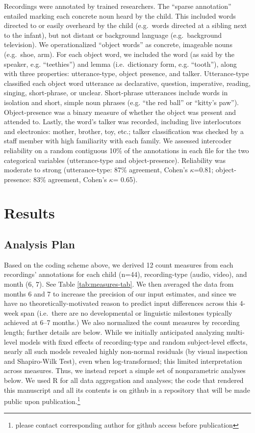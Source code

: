 \documentclass[man]{apa6}
\theoremstyle{definition}
\theoremstyle{definition}
\theoremstyle{definition}
\theoremstyle{remark}
\begin{document}
Recordings were annotated by trained researchers. The \enquote{sparse
annotation} entailed marking each concrete noun heard by the child. This
included words directed to or easily overheard by the child (e.g.~words
directed at a sibling next to the infant), but not distant or background
language (e.g.~background television). We operationalized
\enquote{object words} as concrete, imageable nouns (e.g.~shoe, arm).
For each object word, we included the word (as said by the speaker, e.g.
\enquote{teethies}) and lemma (i.e.~dictionary form, e.g.
\enquote{tooth}), along with three properties: utterance-type, object
presence, and talker. Utterance-type classified each object word
utterance as declarative, question, imperative, reading, singing,
short-phrase, or unclear. Short-phrase utterances include words in
isolation and short, simple noun phrases (e.g. \enquote{the red ball} or
\enquote{kitty's paw}). Object-presence was a binary measure of whether
the object was present and attended to. Lastly, the word's talker was
recorded, including live interlocutors and electronics: mother, brother,
toy, etc.; talker classification was checked by a staff member with high
familiarity with each family. We assessed intercoder reliability on a
random contiguous 10\% of the annotations in each file for the two
categorical variables (utterance-type and object-presence). Reliability
was moderate to strong (utterance-type: 87\% agreement, Cohen's
\(\kappa\)=0.81; object-presence: 83\% agreement, Cohen's \(\kappa\)=
0.65).

\section{Results}\label{results}

\subsection{Analysis Plan}\label{analysis-plan}

Based on the coding scheme above, we derived 12 count measures from each
recordings' annotations for each child (n=44), recording-type (audio,
video), and month (6, 7). See Table \ref{tab:measures-tab}. We then
averaged the data from months 6 and 7 to increase the precision of our
input estimates, and since we have no theoretically-motivated reason to
predict input differences across this 4-week span (i.e.~there are no
developmental or linguistic milestones typically achieved at 6--7
months.) We also normalized the count measures by recording length;
further details are below. While we initially anticipated analyzing
multi-level models with fixed effects of recording-type and random
subject-level effects, nearly all such models revealed highly non-normal
residuals (by visual inspection and Shapiro-Wilk Test), even when
log-transformed; this limited interpretation across measures. Thus, we
instead report a simple set of nonparametric analyses below. We used R
for all data aggregation and analyses; the code that rendered this
manuscript and all its contents is on github in a repository that will
be made public upon
publication.\footnote{please contact corresponding author for github access before publication}
\end{document}
